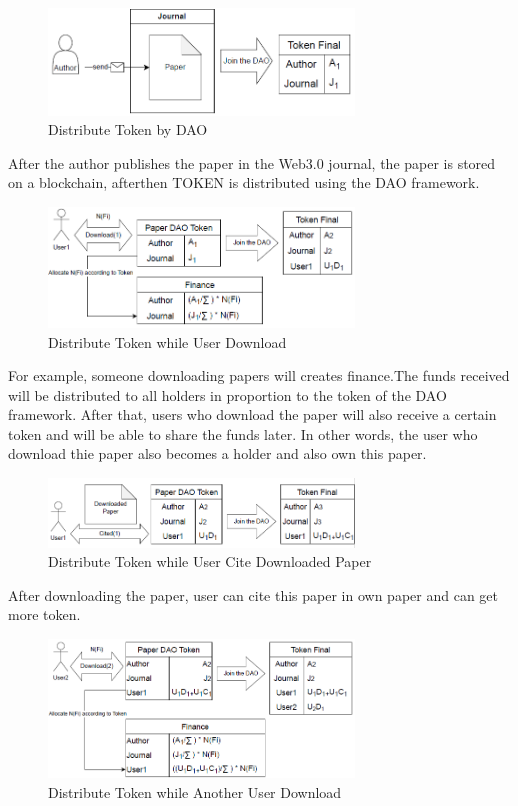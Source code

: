 \documentclass[lettersize,journal]{IEEEtran}
\begin{document}
\begin{figure}[h]
  \centering
  \includegraphics[width=3.2in]{assets/daopaper.png}
  \caption{Distribute Token by DAO}
\end{figure}


After the author publishes the paper in the Web3.0 journal, the paper is stored on a blockchain, afterthen TOKEN is distributed using the DAO framework.


\begin{figure}[h]
  \centering
  \includegraphics[width=3.2in]{assets/download1.png}
  \caption{Distribute Token while User Download}
\end{figure}


For example, someone downloading papers will creates finance.The funds received will be distributed to all holders in proportion to the token of the DAO framework. After that, users who download the paper will also receive a certain token and will be able to share the funds later. In other words, the user who download thie paper also becomes a holder and also own this paper.


\begin{figure}[h]
  \centering
  \includegraphics[width=3.2in]{assets/cite1.png}
  \caption{Distribute Token while User Cite Downloaded Paper}
\end{figure}


After downloading the paper, user can cite this paper in own paper and can get more token.


\begin{figure}[h]
  \centering
  \includegraphics[width=3.2in]{assets/donwload2.png}
  \caption{Distribute Token while Another User Download}
\end{figure}
\end{document}
